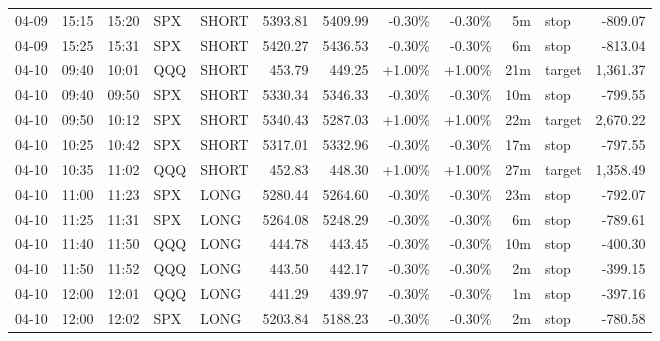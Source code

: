 \documentclass[11pt,a4paper,twoside]{article}
\begin{document}
\begin{center}
\begin{longtable}{>{\color{txtmain}}l l l l l r r r r r >{\color{txtmain}}l r}
04-09 & 15:15 & 15:20 & SPX & SHORT & 5393.81 & 5409.99 & \textcolor{lossred}{-0.30\%} & \textcolor{lossred}{-0.30\%} & 5m & stop & \textcolor{lossred}{-809.07} \\
04-09 & 15:25 & 15:31 & SPX & SHORT & 5420.27 & 5436.53 & \textcolor{lossred}{-0.30\%} & \textcolor{lossred}{-0.30\%} & 6m & stop & \textcolor{lossred}{-813.04} \\
04-10 & 09:40 & 10:01 & QQQ & SHORT & 453.79 & 449.25 & \textcolor{wingreen}{+1.00\%} & \textcolor{wingreen}{+1.00\%} & 21m & target & \textcolor{wingreen}{1,361.37} \\
04-10 & 09:40 & 09:50 & SPX & SHORT & 5330.34 & 5346.33 & \textcolor{lossred}{-0.30\%} & \textcolor{lossred}{-0.30\%} & 10m & stop & \textcolor{lossred}{-799.55} \\
04-10 & 09:50 & 10:12 & SPX & SHORT & 5340.43 & 5287.03 & \textcolor{wingreen}{+1.00\%} & \textcolor{wingreen}{+1.00\%} & 22m & target & \textcolor{wingreen}{2,670.22} \\
04-10 & 10:25 & 10:42 & SPX & SHORT & 5317.01 & 5332.96 & \textcolor{lossred}{-0.30\%} & \textcolor{lossred}{-0.30\%} & 17m & stop & \textcolor{lossred}{-797.55} \\
04-10 & 10:35 & 11:02 & QQQ & SHORT & 452.83 & 448.30 & \textcolor{wingreen}{+1.00\%} & \textcolor{wingreen}{+1.00\%} & 27m & target & \textcolor{wingreen}{1,358.49} \\
04-10 & 11:00 & 11:23 & SPX & LONG & 5280.44 & 5264.60 & \textcolor{lossred}{-0.30\%} & \textcolor{lossred}{-0.30\%} & 23m & stop & \textcolor{lossred}{-792.07} \\
04-10 & 11:25 & 11:31 & SPX & LONG & 5264.08 & 5248.29 & \textcolor{lossred}{-0.30\%} & \textcolor{lossred}{-0.30\%} & 6m & stop & \textcolor{lossred}{-789.61} \\
04-10 & 11:40 & 11:50 & QQQ & LONG & 444.78 & 443.45 & \textcolor{lossred}{-0.30\%} & \textcolor{lossred}{-0.30\%} & 10m & stop & \textcolor{lossred}{-400.30} \\
04-10 & 11:50 & 11:52 & QQQ & LONG & 443.50 & 442.17 & \textcolor{lossred}{-0.30\%} & \textcolor{lossred}{-0.30\%} & 2m & stop & \textcolor{lossred}{-399.15} \\
04-10 & 12:00 & 12:01 & QQQ & LONG & 441.29 & 439.97 & \textcolor{lossred}{-0.30\%} & \textcolor{lossred}{-0.30\%} & 1m & stop & \textcolor{lossred}{-397.16} \\
04-10 & 12:00 & 12:02 & SPX & LONG & 5203.84 & 5188.23 & \textcolor{lossred}{-0.30\%} & \textcolor{lossred}{-0.30\%} & 2m & stop & \textcolor{lossred}{-780.58} \\

\end{longtable}
\end{center}
\end{document}
